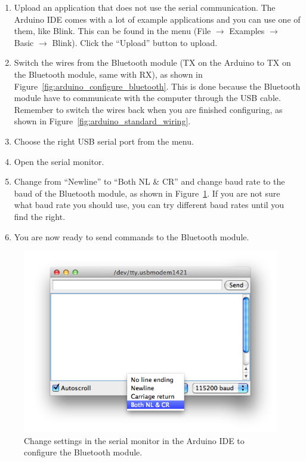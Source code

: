 		\begin{enumerate}
		\item Upload an application that does not use the serial communication. The Arduino IDE comes with a lot of example applications and you can use one of them, like Blink. This can be found in the menu (File $\rightarrow$ Examples $\rightarrow$ Basic $\rightarrow$ Blink). Click the ``Upload'' button to upload.
		
		\item Switch the wires from the Bluetooth module (TX on the Arduino to TX on the Bluetooth module, same with RX), as shown in Figure~\ref{fig:arduino_configure_bluetooth}. This is done because the Bluetooth module have to communicate with the computer through the USB cable. Remember to switch the wires back when you are finished configuring, as shown in Figure~\ref{fig:arduino_standard_wiring}.
		
		\item Choose the right USB serial port from the menu.
		
		\item Open the serial monitor.
		
		\item Change from ``Newline'' to ``Both NL \& CR'' and change baud rate to the baud of the Bluetooth module, as shown in Figure~\ref{fig:serial_monitor}. If you are not sure what baud rate you should use, you can try different baud rates until you find the right.
		
		\item You are now ready to send commands to the Bluetooth module.
		\end{enumerate}
		
		\begin{figure}[H]
			\centering
			\includegraphics[scale=0.5]{images/serial_monitor.png}
			\caption{Change settings in the serial monitor in the Arduino IDE to configure the Bluetooth module.}
			\label{fig:serial_monitor}
		\end{figure}
		
